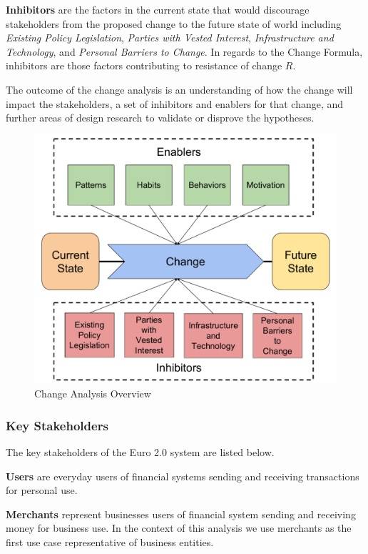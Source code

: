 \documentclass[a4paper,12pt]{article} %
\begin{document}
{\textbf{Inhibitors} are the factors in the current state that would discourage stakeholders from the proposed change to the future state of world including \textit{Existing Policy Legislation}, \textit{Parties with Vested Interest}, \textit{Infrastructure and Technology}, and \textit{Personal Barriers to Change}. In regards to the Change Formula, inhibitors are those factors contributing to resistance of change $R$.

The outcome of the change analysis is an understanding of how the change will impact the stakeholders, a set of inhibitors and enablers for that change, and further areas of design research to validate or disprove the hypotheses.

\begin{figure}[ht]
    \centering
    \includegraphics[width=\textwidth]{change-analysis}
    \caption{Change Analysis Overview}
    \label{fig:changeAnalysis}
\end{figure}

\subsubsection{Key Stakeholders} \label{sssec:4.2:keyStakeholders}

The key stakeholders of the Euro 2.0 system are listed below.

\textbf{Users} are everyday users of financial systems sending and receiving transactions for personal use.

\textbf{Merchants} represent businesses users of financial system sending and receiving money for business use. In the context of this analysis we use merchants as the first use case representative of business entities.

}
\end{document}
